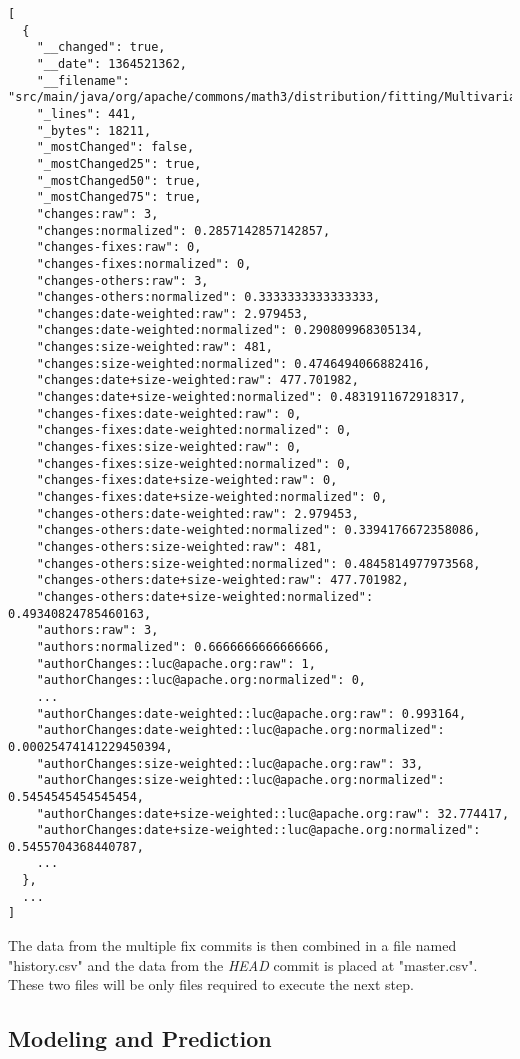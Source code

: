 \begin{lstlisting}
[
  {
    "__changed": true,
    "__date": 1364521362,
    "__filename": "src/main/java/org/apache/commons/math3/distribution/fitting/MultivariateNormalMixtureExpectationMaximization.java",
    "_lines": 441,
    "_bytes": 18211,
    "_mostChanged": false,
    "_mostChanged25": true,
    "_mostChanged50": true,
    "_mostChanged75": true,
    "changes:raw": 3,
    "changes:normalized": 0.2857142857142857,
    "changes-fixes:raw": 0,
    "changes-fixes:normalized": 0,
    "changes-others:raw": 3,
    "changes-others:normalized": 0.3333333333333333,
    "changes:date-weighted:raw": 2.979453,
    "changes:date-weighted:normalized": 0.290809968305134,
    "changes:size-weighted:raw": 481,
    "changes:size-weighted:normalized": 0.4746494066882416,
    "changes:date+size-weighted:raw": 477.701982,
    "changes:date+size-weighted:normalized": 0.4831911672918317,
    "changes-fixes:date-weighted:raw": 0,
    "changes-fixes:date-weighted:normalized": 0,
    "changes-fixes:size-weighted:raw": 0,
    "changes-fixes:size-weighted:normalized": 0,
    "changes-fixes:date+size-weighted:raw": 0,
    "changes-fixes:date+size-weighted:normalized": 0,
    "changes-others:date-weighted:raw": 2.979453,
    "changes-others:date-weighted:normalized": 0.3394176672358086,
    "changes-others:size-weighted:raw": 481,
    "changes-others:size-weighted:normalized": 0.4845814977973568,
    "changes-others:date+size-weighted:raw": 477.701982,
    "changes-others:date+size-weighted:normalized": 0.49340824785460163,
    "authors:raw": 3,
    "authors:normalized": 0.6666666666666666,
    "authorChanges::luc@apache.org:raw": 1,
    "authorChanges::luc@apache.org:normalized": 0,
    ...
    "authorChanges:date-weighted::luc@apache.org:raw": 0.993164,
    "authorChanges:date-weighted::luc@apache.org:normalized": 0.00025474141229450394,
    "authorChanges:size-weighted::luc@apache.org:raw": 33,
    "authorChanges:size-weighted::luc@apache.org:normalized": 0.5454545454545454,
    "authorChanges:date+size-weighted::luc@apache.org:raw": 32.774417,
    "authorChanges:date+size-weighted::luc@apache.org:normalized": 0.5455704368440787,
    ...
  },
  ...
]
\end{lstlisting}


The data from the multiple fix commits is then combined in a file named "history.csv" and the data from the \emph{HEAD} commit is placed at "master.csv".
These two files will be only files required to execute the next step.


\subsection{Modeling and Prediction}

